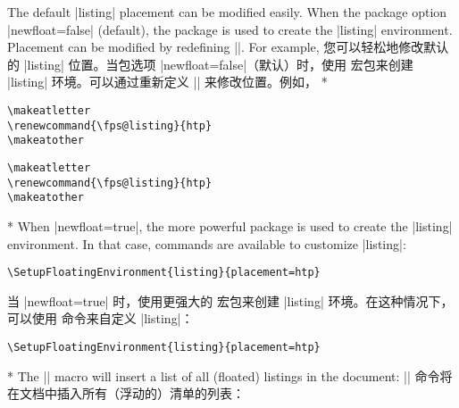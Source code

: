 \begin{paracol}{2}
The default |listing| placement can be modified easily.  When the package option |newfloat=false| (default), the  package is used to create the |listing| environment.  Placement can be modified by redefining |\fps@listing|.  For example,
\switchcolumn
您可以轻松地修改默认的 |listing| 位置。当包选项 |newfloat=false|（默认）时，使用  宏包来创建 |listing| 环境。可以通过重新定义 |\fps@listing| 来修改位置。例如，
\switchcolumn[0]*%
\begin{verbatim}
\makeatletter
\renewcommand{\fps@listing}{htp}
\makeatother
\end{verbatim}
\switchcolumn
\begin{verbatim}
\makeatletter
\renewcommand{\fps@listing}{htp}
\makeatother
\end{verbatim}
\switchcolumn[0]*%
When |newfloat=true|, the more powerful  package is used to create the |listing| environment.  In that case,  commands are available to customize |listing|:
\begin{verbatim}
\SetupFloatingEnvironment{listing}{placement=htp}
\end{verbatim}
\switchcolumn
当 |newfloat=true| 时，使用更强大的  宏包来创建 |listing| 环境。在这种情况下，可以使用  命令来自定义 |listing|：
\begin{verbatim}
\SetupFloatingEnvironment{listing}{placement=htp}
\end{verbatim}
\switchcolumn[0]*%
\DescribeMacro{\listoflistings}
The |\listoflistings| macro will insert a list of all (floated) listings in the document:
\switchcolumn
\DescribeMacro{\listoflistings}
|\listoflistings| 命令将在文档中插入所有（浮动的）清单的列表：
\end{paracol}

\begin{example}
    \listoflistings
\end{example}

